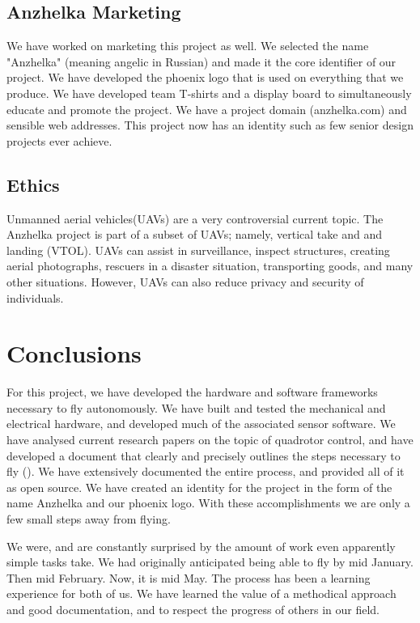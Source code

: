 \documentclass{article}
\numberwithin{equation}{section} %
\begin{document}
\subsection{Anzhelka Marketing}
We have worked on marketing this project as well. We selected the name "Anzhelka" (meaning angelic in Russian) and made it the core identifier of our project. We have developed the phoenix logo that is used on everything that we produce. We have developed team T-shirts and a display board to simultaneously educate and promote the project. We have a project domain (anzhelka.com) and sensible web addresses. This project now has an identity such as few senior design projects ever achieve.

\subsection{Ethics}

Unmanned aerial vehicles(UAVs) are a very controversial current topic. The Anzhelka project is part of a subset of UAVs; namely, vertical take and and landing (VTOL). UAVs can assist in surveillance, inspect structures, creating aerial photographs, rescuers in a disaster situation, transporting goods, and many other situations. However, UAVs can also reduce privacy and security of individuals.




\section{Conclusions}
For this project, we have developed the hardware and software frameworks necessary to fly autonomously. We have built and tested the mechanical and electrical hardware, and developed much of the associated sensor software. We have analysed current research papers on the topic of quadrotor control, and have developed a document that clearly and precisely outlines the steps necessary to fly (\cite{anzhelka_math}). We have extensively documented the entire process, and provided all of it as open source. We have created an identity for the project in the form of the name Anzhelka and our phoenix logo. With these accomplishments we are only a few small steps away from flying.

We were, and are constantly surprised by the amount of work even apparently simple tasks take. We had originally anticipated being able to fly by mid January. Then mid February. Now, it is mid May. The process has been a learning experience for both of us. We have learned the value of a methodical approach and good documentation, and to respect the progress of others in our field.
\end{document}
